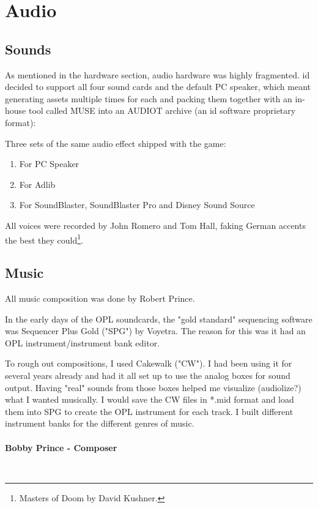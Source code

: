 \documentclass[book.tex]{subfiles}
\begin{document}
\section{Audio}

\subsection{Sounds}
As mentioned in the hardware section, audio hardware was highly fragmented. id decided to support all four sound cards and the default PC speaker, which meant generating assets multiple times for each and packing them together with an in-house tool called MUSE into an AUDIOT archive (an id software proprietary format):\\
\begin{figure}[H]
\centering

 
 \end{figure}
 \par
 Three sets of the same audio effect shipped with the game:
\begin{enumerate}
\item For PC Speaker
\item For Adlib
\item For SoundBlaster, SoundBlaster Pro and Disney Sound Source
\end{enumerate}

\par
All voices were recorded by John Romero and Tom Hall, faking German accents the best they could\footnote{Masters of Doom by David Kushner.}.






\subsection{Music}
All music composition was done by Robert Prince.\\
\par
 \begin{fancyquotes}
In the early days of the OPL soundcards, the "gold standard" sequencing software was Sequencer Plus Gold ("SPG") by Voyetra. The reason for this was it had an OPL instrument/instrument bank editor.\\
\par
To rough out compositions, I used Cakewalk ("CW"). I had been using it for several years already and had it all set up to use the analog boxes for sound output. Having "real" sounds from those boxes helped me visualize (audiolize?) what I wanted musically. I would save the CW files in *.mid format and load them into SPG to create the OPL instrument for each track. I built different instrument banks for the different genres of music.\\
   \\
\textbf{Bobby Prince - Composer}
 \end{fancyquotes}\\
\end{document}
